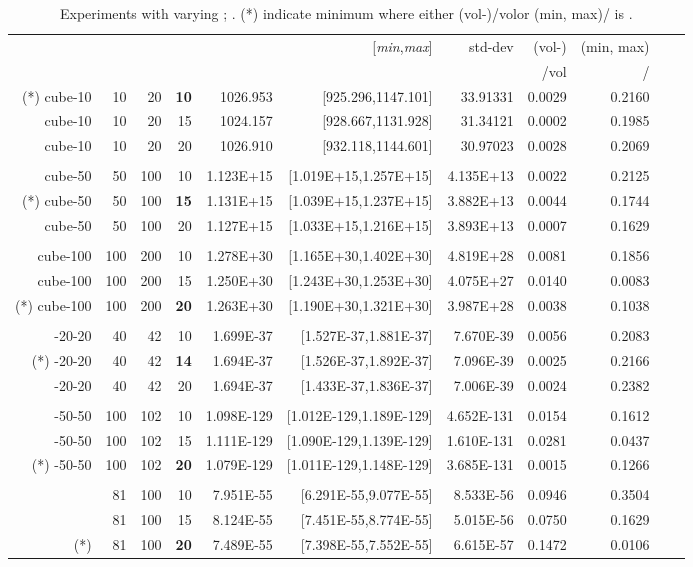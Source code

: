 \documentclass[11pt,a4paper]{article}
\def\vol{\mbox{vol}}
\def\vol{\mbox{vol}}
\def\Min{{\it min}}
\def\Max{{\it max}}
\begin{document}
\begin{table}[t!]\centering\scriptsize
\begin{tabular*}{\linewidth}{@{\extracolsep{\fill}}rrrrrrrrrrr}
 &  &  &  &  & [\Min,\Max] & std-dev & (\vol-) & 
(min, max) \\
&  &  & &  & &  & /\vol & / \\
\hline
(*) cube-10 & 10 & 20 & {\bf 10} & 1026.953 & [925.296,1147.101] & 33.91331 & 0.0029 & 0.2160\\
cube-10 & 10 & 20 & 15 & 1024.157 & [928.667,1131.928] & 31.34121 & 0.0002 & 0.1985\\
cube-10 & 10 & 20 & 20 & 1026.910 & [932.118,1144.601] & 30.97023 & 0.0028 & 0.2069\\
 &  &  &  &  &  &  &  & \\
cube-50 & 50 & 100 & 10 & 1.123E+15 & [1.019E+15,1.257E+15] & 4.135E+13 & 0.0022 & 0.2125\\
(*) cube-50 & 50 & 100 & {\bf 15} & 1.131E+15 & [1.039E+15,1.237E+15] & 3.882E+13 & 0.0044 & 0.1744\\
cube-50 & 50 & 100 & 20 & 1.127E+15 & [1.033E+15,1.216E+15] & 3.893E+13 & 0.0007 & 0.1629\\
 &  &  &  &  &  &  &  & \\
cube-100 & 100 & 200 & 10 & 1.278E+30 & [1.165E+30,1.402E+30] & 4.819E+28 & 0.0081 & 0.1856\\
cube-100 & 100 & 200 & 15 & 1.250E+30 & [1.243E+30,1.253E+30] & 4.075E+27 & 0.0140 & 0.0083\\
(*) cube-100 & 100 & 200 & {\bf 20} & 1.263E+30 & [1.190E+30,1.321E+30] & 3.987E+28 & 0.0038 & 0.1038\\
 &  &  &  &  &  &  &  & \\
-20-20 & 40 & 42 & 10 & 1.699E-37 & [1.527E-37,1.881E-37] & 7.670E-39 & 0.0056 & 0.2083\\
(*) -20-20 & 40 & 42 & {\bf 14} & 1.694E-37 & [1.526E-37,1.892E-37] & 7.096E-39 & 0.0025 & 0.2166\\
-20-20 & 40 & 42 & 20 & 1.694E-37 & [1.433E-37,1.836E-37] & 7.006E-39 & 0.0024 & 0.2382\\
 &  &  &  &  &  &  &  & \\
-50-50 & 100 & 102 & 10 & 1.098E-129 & [1.012E-129,1.189E-129] & 4.652E-131 & 0.0154 & 0.1612\\
-50-50 & 100 & 102 & 15 & 1.111E-129 & [1.090E-129,1.139E-129] & 1.610E-131 & 0.0281 & 0.0437\\
(*) -50-50 & 100 & 102 & {\bf 20} & 1.079E-129 & [1.011E-129,1.148E-129] & 3.685E-131 & 0.0015 & 0.1266\\
 &  &  &  &  &  &  &  & \\
 & 81 & 100 & 10 & 7.951E-55 & [6.291E-55,9.077E-55] & 8.533E-56 & 0.0946 & 0.3504\\
 & 81 & 100 & 15 & 8.124E-55 & [7.451E-55,8.774E-55] & 5.015E-56 & 0.0750 & 0.1629\\
(*)  & 81 & 100 & {\bf 20} & 7.489E-55 & [7.398E-55,7.552E-55] & 6.615E-57 & 0.1472 & 0.0106\\
\end{tabular*} 
\caption{ Experiments with varying ; .  (*) 
indicate minimum  where either (\vol-)/\vol or
(min, max)/ is .  \label{table:walk_len}}
\end{table}
\end{document}
